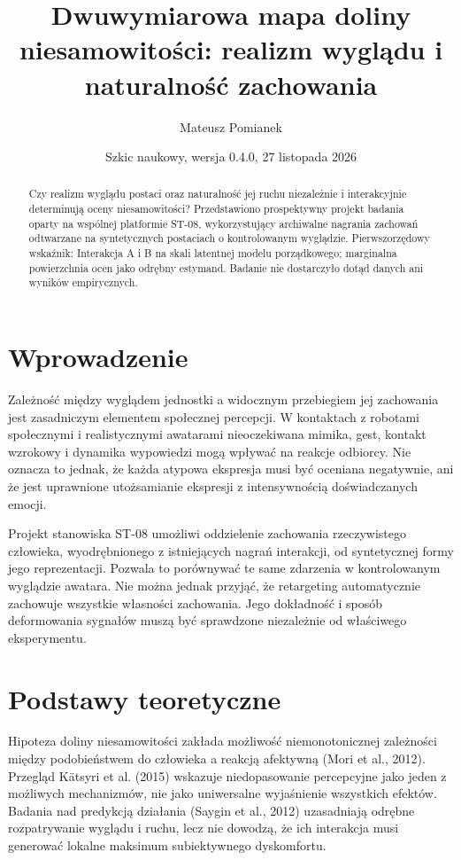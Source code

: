 \documentclass[11pt,a4paper]{article}
\title{Dwuwymiarowa mapa doliny niesamowitości: realizm wyglądu i naturalność zachowania}
\author{Mateusz Pomianek}
\date{Szkic naukowy, wersja 0.4.0, 27 listopada 2026}
\begin{document}
\maketitle
\begin{abstract}
Czy realizm wyglądu postaci oraz naturalność jej ruchu niezależnie i interakcyjnie determinują oceny niesamowitości? Przedstawiono prospektywny projekt badania oparty na wspólnej platformie ST-08, wykorzystujący archiwalne nagrania zachowań odtwarzane na syntetycznych postaciach o kontrolowanym wyglądzie. Pierwszorzędowy wskaźnik: Interakcja A i B na skali latentnej modelu porządkowego; marginalna powierzchnia ocen jako odrębny estymand. Badanie nie dostarczyło dotąd danych ani wyników empirycznych.
\end{abstract}
\section{Wprowadzenie}
Zależność między wyglądem jednostki a widocznym przebiegiem jej zachowania jest zasadniczym elementem społecznej percepcji. W kontaktach z robotami społecznymi i realistycznymi awatarami nieoczekiwana mimika, gest, kontakt wzrokowy i dynamika wypowiedzi mogą wpływać na reakcje odbiorcy. Nie oznacza to jednak, że każda atypowa ekspresja musi być oceniana negatywnie, ani że jest uprawnione utożsamianie ekspresji z intensywnością doświadczanych emocji.

Projekt stanowiska ST-08 umożliwi oddzielenie zachowania rzeczywistego człowieka, wyodrębnionego z istniejących nagrań interakcji, od syntetycznej formy jego reprezentacji. Pozwala to porównywać te same zdarzenia w kontrolowanym wyglądzie awatara. Nie można jednak przyjąć, że retargeting automatycznie zachowuje wszystkie własności zachowania. Jego dokładność i sposób deformowania sygnałów muszą być sprawdzone niezależnie od właściwego eksperymentu.
\section{Podstawy teoretyczne}
Hipoteza doliny niesamowitości zakłada możliwość niemonotonicznej zależności między podobieństwem do człowieka a reakcją afektywną (Mori et al., 2012). Przegląd Kätsyri et al. (2015) wskazuje niedopasowanie percepcyjne jako jeden z możliwych mechanizmów, nie jako uniwersalne wyjaśnienie wszystkich efektów. Badania nad predykcją działania (Saygin et al., 2012) uzasadniają odrębne rozpatrywanie wyglądu i ruchu, lecz nie dowodzą, że ich interakcja musi generować lokalne maksimum subiektywnego dyskomfortu.
\end{document}
